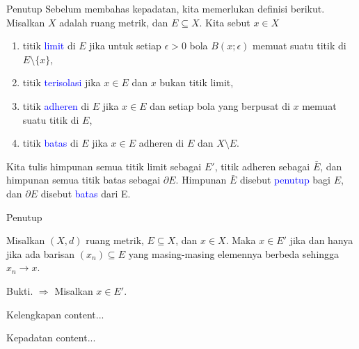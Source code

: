 \documentclass[xcolor={dvipsnames}, 9pt]{beamer}
\renewcommand{\emph}[1]{\textcolor{Blue}{#1}}
\begin{document}
    \begin{frame}{Penutup}
    	Sebelum membahas kepadatan, kita memerlukan definisi berikut. \newline
    	Misalkan $X$ adalah ruang metrik, dan $E\subseteq X$. Kita sebut $x\in X$
    	\begin{enumerate}
    		\item titik \emph{limit} di $E$ jika untuk setiap $\epsilon>0$ bola $B(x;\epsilon)$ memuat suatu titik di $E\setminus\{x\}$,
    		\item titik \emph{terisolasi} jika $x\in E$ dan $x$ bukan titik limit,
    		\item titik \emph{adheren} di $E$ jika $x\in E$ dan setiap bola yang berpusat di $x$ memuat suatu titik di $E$,
    		\item titik \emph{batas} di $E$ jika $x\in E$ adheren di $E$ dan $X\setminus E$.
    	\end{enumerate}
    	Kita tulis himpunan semua titik limit sebagai $E'$, titik adheren sebagai $\bar{E}$, dan himpunan semua titik batas sebagai $\partial E$. Himpunan $\bar{E}$ disebut \emph{penutup} bagi $E$, dan $\partial E$ disebut \emph{batas} dari E.
    \end{frame}
    \begin{frame}{Penutup}
    	\begin{theorem}
    		Misalkan $(X,d)$ ruang metrik, $E\subseteq X$, dan $x\in X$. Maka $x\in E'$ jika dan hanya jika ada barisan $(x_n)\subseteq E$ yang masing-masing elemennya berbeda sehingga $x_n\to x$.
    	\end{theorem}
    	Bukti. $\boxed{\Rightarrow}$ Misalkan $x\in E'$. 
    \end{frame}
    \begin{frame}{Kelengkapan}
    	content...
    \end{frame}
    \begin{frame}{Kepadatan}
    	content...
    \end{frame}
\end{document}
